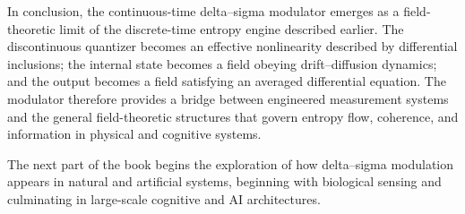 In conclusion, the continuous-time delta–sigma modulator emerges as a field-theoretic limit of the discrete-time entropy engine described earlier. The discontinuous quantizer becomes an effective nonlinearity described by differential inclusions; the internal state becomes a field obeying drift–diffusion dynamics; and the output becomes a field satisfying an averaged differential equation. The modulator therefore provides a bridge between engineered measurement systems and the general field-theoretic structures that govern entropy flow, coherence, and information in physical and cognitive systems.

The next part of the book begins the exploration of how delta–sigma modulation appears in natural and artificial systems, beginning with biological sensing and culminating in large-scale cognitive and AI architectures.

